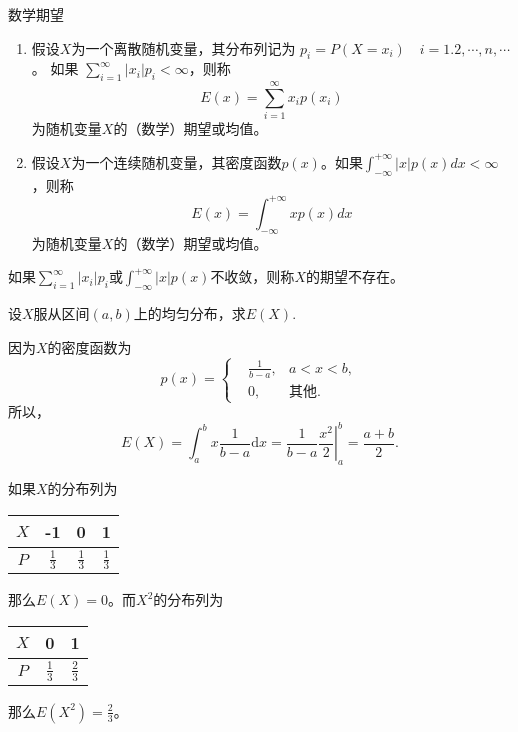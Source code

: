 \begin{definition}{数学期望}\label{def:expectation}
\begin{enumerate}
\item 假设$X$为一个离散随机变量，其分布列记为
        $p_{i}=P\left(X=x_{i}\right) \quad i=1.2, \cdots, n, \cdots$。
    如果 $\sum_{i=1}^{\infty}\left|x_{i}\right| p_{i}<\infty$，则称 
    $$E(x)=\sum_{i=1}^{\infty} x_{i} p\left(x_{i}\right)$$
        为随机变量$X$的（数学）期望或均值。
\item 假设$X$为一个连续随机变量，其密度函数$p(x)$。如果$\int_{-\infty}^{+\infty}|x| p(x) d x<\infty$，则称 $$E(x)=\int_{-\infty}^{+\infty} x p(x) d x$$
为随机变量$X$的（数学）期望或均值。
\end{enumerate}
\end{definition}
\begin{remark}
    如果$\sum_{i=1}^{\infty}\left|x_{i}\right| p_{i}$或$\int_{-\infty}^{+\infty}|x| p(x)$不收敛，则称$X$的期望不存在。
\end{remark}
\begin{example}
设$X$服从区间$(a,b)$上的均匀分布，求$E(X)$.
\end{example}
\begin{solution}
因为$X$的密度函数为
$$
p(x) = \left\{
\begin{aligned}
  &  \frac{1}{b-a}, & a<x<b,\\
  &  0, &  \text{其他}.
\end{aligned}
\right.
$$
所以，
$$
E(X) = \int_{a}^b x \frac{1}{b-a}\text{d} x = \frac{1}{b-a} \left.\frac{x^2}{2}\right|_a^b = \frac{a+b}{2}.
$$
\end{solution}

\begin{example}\label{ex:chap06_discrete_rv_expectation}
如果$X$的分布列为
 \begin{table}[ht]
        \centering
\begin{tabular}{c|ccc}
$X$ & -1          & 0  & 1           \\ \hline
$P$ & $\frac{1}{3}$ & $\frac{1}{3}$ & $\frac{1}{3}$
\end{tabular}
\end{table}

那么$E(X) = 0$。而$X^2$的分布列为
\begin{table}[ht]
        \centering
\begin{tabular}{c|cc}
$X$ &            0  & 1           \\ \hline
$P$ &  $\frac{1}{3}$ & $\frac{2}{3}$
\end{tabular}
\end{table}

那么$E(X^2) = \frac{2}{3}$。
\end{example}

